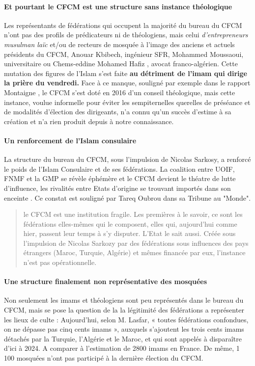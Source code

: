 \paragraph{Et  pourtant le CFCM est une structure sans instance théologique} Les représentants de fédérations qui occupent la majorité du bureau du CFCM n'ont pas des profils de prédicateurs ni de théologiens, mais celui \textit{d'entrepreneurs musulman laïc}  et/ou de recteurs de mosquée à l'image des anciens et actuels présidents du CFCM, Anouar Kbibech, ingénieur SFR, Mohammed Moussaoui, universitaire ou Chems-eddine Mohamed Hafiz , avocat franco-algérien.  Cette mutation des figures de l'Islam s'est faite \textbf{au détriment de l'imam qui dirige la prière du vendredi.}
Face à ce manque, souligné par exemple dans le rapport Montaigne , le CFCM s'est doté en 2016 d'un conseil théologique, mais cette instance, voulue informelle pour éviter les sempiternelles querelles de préséance et de modalités d’élection des dirigeants, n'a connu qu'un succès d'estime à sa création et n'a rien produit depuis à notre connaissance.



\paragraph{Un renforcement de l'Islam consulaire} La structure du bureau du CFCM, sous l'impulsion de Nicolas Sarkosy, a renforcé le poids de l'Islam Consulaire et de ses fédérations. La coalition entre UOIF, FNMF et la GMP se révèle éphémère et le CFCM devient le théatre de lutte d'influence, les rivalités entre Etats d'origine se trouvant importés dans son enceinte . Ce constat est souligné par Tareq Oubrou dans sa Tribune au "Monde".
\begin{quote}
    le CFCM est une institution fragile. Les premières à le savoir, ce sont les fédérations elles-mêmes qui le composent, elles qui, aujourd’hui comme hier, passent leur temps à s’y disputer. L’Etat le sait aussi.
Créée sous l’impulsion de Nicolas Sarkozy par des fédérations sous influences des pays étrangers (Maroc, Turquie, Algérie) et mêmes financée par eux, l’instance n’est pas opérationnelle.
\end{quote}




\paragraph{Une structure finalement non représentative des mosquées} Non seulement les  imams et théologiens sont peu représentés dans le bureau du CFCM, mais se pose la question de la la légitimité des fédérations a représenter les lieux de culte : Aujourd’hui, selon M. Lasfar, « toutes fédérations confondues, on ne dépasse pas cinq cents imams », auxquels s’ajoutent les trois cents imams détachés par la Turquie, l’Algérie et le Maroc, et qui sont appelés à disparaître d’ici à 2024. A comparer à l'estimation de 2800 imams en France. De même, 1 100 mosquées n’ont pas participé à la dernière élection du CFCM. 

